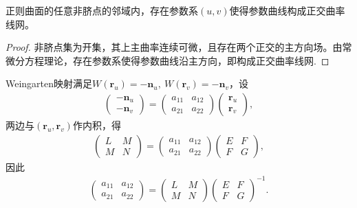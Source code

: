 \documentclass[../../main.tex]{subfiles}%
\begin{document}
\begin{theorem}
正则曲面的任意非脐点的邻域内，存在参数系$(u,v)$使得参数曲线构成正交曲率线网。
\end{theorem}
\begin{proof}

非脐点集为开集，其上主曲率连续可微，且存在两个正交的主方向场。由常微分方程理论，存在参数系使得参数曲线沿主方向，即构成正交曲率线网.

\end{proof}


Weingarten映射满足$W(\boldsymbol{r}_u)=-\boldsymbol{n}_u,\ W(\boldsymbol{r}_v)=-\boldsymbol{n}_v$，设
\begin{align}
\begin{pmatrix}
-\boldsymbol{n}_u\\
-\boldsymbol{n}_v
\end{pmatrix}=
\begin{pmatrix}
a_{11} & a_{12}\\
a_{21} & a_{22}
\end{pmatrix}
\begin{pmatrix}
\boldsymbol{r}_u\\
\boldsymbol{r}_v
\end{pmatrix},\label{eq:weingarten_matrix_def}
\end{align}
两边与$(\boldsymbol{r}_u,\boldsymbol{r}_v)$作内积，得
\begin{align*}
\begin{pmatrix}
L & M\\
M & N
\end{pmatrix}=
\begin{pmatrix}
a_{11} & a_{12}\\
a_{21} & a_{22}
\end{pmatrix}
\begin{pmatrix}
E & F\\
F & G
\end{pmatrix},
\end{align*}
因此
\begin{align}
\begin{pmatrix}
a_{11} & a_{12}\\
a_{21} & a_{22}
\end{pmatrix}=
\begin{pmatrix}
L & M\\
M & N
\end{pmatrix}
\begin{pmatrix}
E & F\\
F & G
\end{pmatrix}^{-1}.\label{eq:weingarten_matrix_formula}
\end{align}
\end{document}
